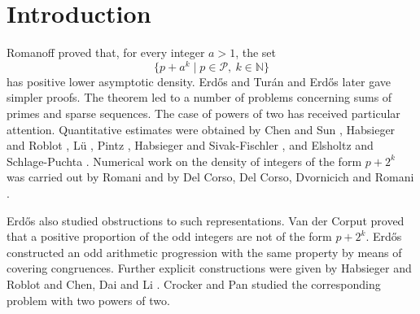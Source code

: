 \documentclass[11pt,reqno]{amsart}
\numberwithin{equation}{section}
\begin{document}
    \section{Introduction}

    Romanoff \cite{Romanoff} proved that, for every integer $a>1$, the set
    $$
    \{p+a^k\mid p\in\mathcal{P},\ k\in\mathbb{N}\}
    $$
    has positive lower asymptotic density. Erd\H{o}s and Tur\'an \cite{ErdosTuran1935a,ErdosTuran1935b} and Erd\H{o}s \cite{Erdos1951} later gave simpler proofs. The theorem led to a number of problems concerning sums of primes and sparse sequences. The case of powers of two has received particular attention. Quantitative estimates were obtained by Chen and Sun \cite{ChenSun}, Habsieger and Roblot \cite{HabsiegerRoblot}, L\"u \cite{Lv}, Pintz \cite{Pintz}, Habsieger and Sivak-Fischler \cite{HabsiegerSivak}, and Elsholtz and Schlage-Puchta \cite{ElsholtzSchlage}. Numerical work on the density of integers of the form $p+2^k$ was carried out by Romani \cite{RomaniThesis,Romani} and by Del Corso, Del Corso, Dvornicich and Romani \cite{DelCorso}.

    Erd\H{o}s also studied obstructions to such representations. Van der Corput \cite{Corput} proved that a positive proportion of the odd integers are not of the form $p+2^k$. Erd\H{o}s \cite{Erdos1950} constructed an odd arithmetic progression with the same property by means of covering congruences. Further explicit constructions were given by Habsieger and Roblot \cite{HabsiegerRoblot} and Chen, Dai and Li \cite{ChenDaiLi}. Crocker \cite{Crocker} and Pan \cite{Pan} studied the corresponding problem with two powers of two.
\end{document}
